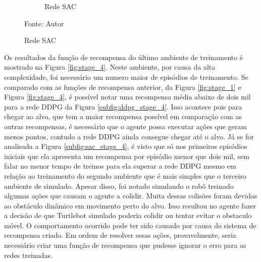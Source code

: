 \begin{figure}[H]
\begin{center}
\begin{subfigure}[b]{0.60\textwidth}
\begin{subfigure}[b]{0.24\textwidth}
        \end{subfigure}
        \caption{Rede SAC}
        \label{subfig:simulated_env3_sac}
    \end{subfigure}
    \label{fig:sim_env3}
    \end{center}
\small{Fonte: Autor}
\end{figure}

Os resultados da função de recompensa do último ambiente de treinamento é mostrado na Figura \ref{fig:stage_4}. 
Neste ambiente, por causa da alta complexidade, foi necessário um numero maior de episódios de treinamento.
Se comparado com as funções de recompensa anterior, da Figura \ref{fig:stage_1} e Figura \ref{fig:stage_4}, é possível notar uma recompensa média abaixo de dois mil para a rede DDPG da Figura \ref{subfig:ddpg_stage_4}.
Isso acontece pois para chegar ao alvo, que tem a maior recompensa possível em comparação com as outras recompensas, é necessário que o agente possa executar ações que geram menos pontos, contudo a rede DDPG ainda consegue chegar até o alvo. 
Já se for analisada a Figura \ref{subfig:sac_stage_4}, é visto que só nos primeiros episódios iniciais que ela apresenta um recompensa por episódio menor que dois mil, sem falar no menor tempo de treinos para ela superar a rede DDPG mesmo em relação ao treinamento do segundo ambiente que é mais simples que o terceiro ambiente de simulado.
Apesar disso, foi notado simulando o robô treinado algumas ações que causam o agente a colidir.
Muita dessas colisões foram devidas ao obstáculo dinâmico em movimento perto do alvo.
Isso resultou no agente fazer a decisão de que Turtlebot simulado poderia colidir ou tentar evitar o obstaculo móvel.
O comportamento ocorrido pode ter sido causado por causa do sistema de recompensa criado.
Em ordem de resolver essas ações, provavelmente, seria necessário criar uma função de recompensa que pudesse ignorar o erro para as redes treinadas.

